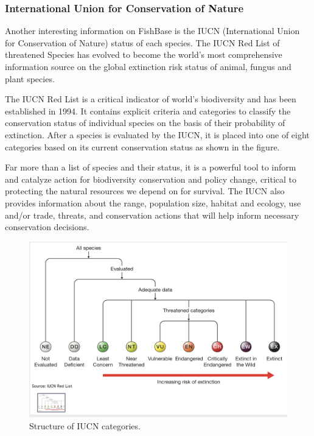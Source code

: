 \documentclass[
]{book}
\begin{document}
\hypertarget{international-union-for-conservation-of-nature}{%
\subsubsection*{International Union for Conservation of Nature}\label{international-union-for-conservation-of-nature}}

Another interesting information on FishBase is the IUCN (International Union for Conservation of Nature) status of each species. The IUCN Red List of threatened Species has evolved to become the world's most comprehensive information source on the global extinction risk status of animal, fungus and plant species.

The IUCN Red List is a critical indicator of world's biodiversity and has been established in 1994. It contains explicit criteria and categories to classify the conservation status of individual species on the basis of their probability of extinction. After a species is evaluated by the IUCN, it is placed into one of eight categories based on its current conservation status as shown in the figure.

Far more than a list of species and their status, it is a powerful tool to inform and catalyze action for biodiversity conservation and policy change, critical to protecting the natural resources we depend on for survival. The IUCN also provides information about the range, population size, habitat and ecology, use and/or trade, threats, and conservation actions that will help inform necessary conservation decisions.

\begin{figure}
\includegraphics[width=17.64in]{./figures/iucn} \caption{Structure of IUCN categories.}\label{fig:iucn}
\end{figure}
\end{document}
